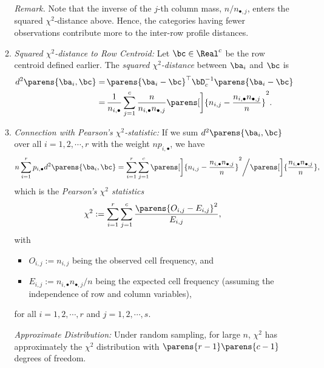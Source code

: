 \documentclass[12pt]{article}
\begin{document}
\begin{enumerate}[label=\textbf{\arabic*.}]
\begin{enumerate}
		\textit{Remark.} Note that the inverse of the $j$-th column mass, $n / n_{\bullet,j}$, enters the squared $\chi^2$-distance above. Hence, the categories having fewer observations contribute more to the inter-row profile distances. 
		
		\item \textit{Squared $\chi^2$-distance to Row Centroid:} Let $\bc \in \Real^c$ be the row centroid defined earlier. The \emph{squared $\chi^2$-distance} between $\ba_i$ and $\bc$ is 
		\begin{align*}
			d^2 \parens{\ba_i, \bc} = & \, \parens{\ba_i - \bc}^\top \bD_c^{-1} \parens{\ba_i - \bc} \\ 
			= & \, \frac{1}{n_{i,\bullet}} \sum_{j=1}^c \frac{n}{n_{i,\bullet} n_{\bullet,j}} \parens[\bigg]{n_{i,j} - \frac{n_{i,\bullet} n_{\bullet,j}}{n}}^2. 
		\end{align*}
		
		\item \textit{Connection with Pearson's $\chi^2$-statistic:} If we sum $d^2 \parens{\ba_i, \bc}$ over all $i = 1, 2, \cdots, r$ with the weight $np_{i,\bullet}$, we have 
		\begin{align*}
			n \sum_{i=1}^r p_{i,\bullet} d^2 \parens{\ba_i, \bc} = \sum_{i=1}^r \sum_{j=1}^c \parens[\bigg]{n_{i,j} - \frac{n_{i,\bullet} n_{\bullet,j}}{n}}^2 \bigg/ \parens[\bigg]{\frac{n_{i,\bullet} n_{\bullet,j}}{n}}, 
		\end{align*}
		which is the \emph{Pearson's $\chi^2$ statistics} 
		\begin{align*}
			\chi^2 := \sum_{i=1}^r \sum_{j=1}^c \frac{\parens{O_{i,j} - E_{i,j}}^2}{E_{i,j}}, 
		\end{align*}
		with 
		\begin{itemize}
			\item $O_{i,j} := n_{i,j}$ being the observed cell frequency, and 
			\item $E_{i,j} := n_{i,\bullet} n_{\bullet,j} / n$ being the expected cell frequency (assuming the independence of row and column variables), 
		\end{itemize}
		for all $i = 1, 2, \cdots, r$ and $j = 1, 2, \cdots, s$. 
		
		\textit{Approximate Distribution:} Under random sampling, for large $n$, $\chi^2$ has approximately the $\chi^2$ distribution with $\parens{r-1} \parens{c-1}$ degrees of freedom. 
		
	\end{enumerate}
	

\end{enumerate}
\end{document}
